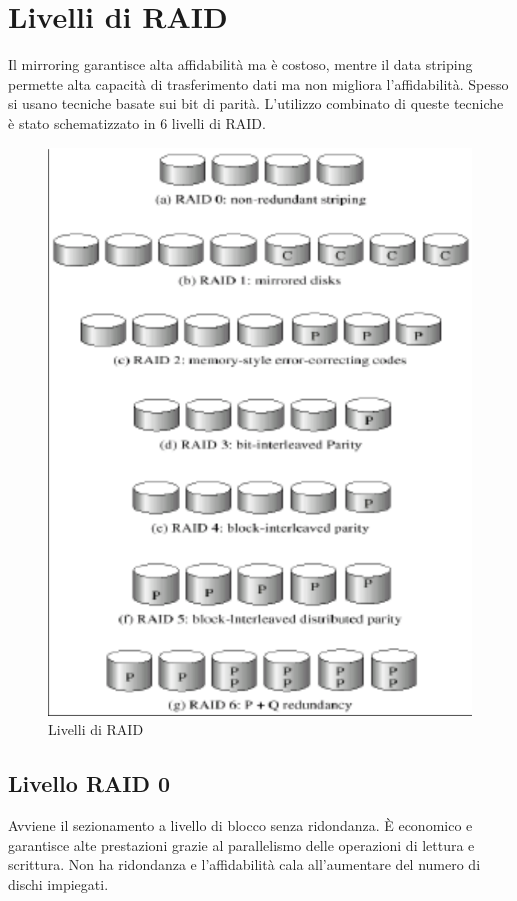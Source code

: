 \section{Livelli di RAID}
Il mirroring garantisce alta affidabilit\`a ma \`e costoso, mentre il data striping permette alta capacit\`a di trasferimento dati ma non migliora l'affidabilit\`a. Spesso si usano
tecniche basate sui bit di parit\`a. L'utilizzo combinato di queste tecniche \`e stato schematizzato in $6$ livelli di RAID. 
\begin{figure}[h]
	\includegraphics[width=\textwidth]{Pictures/RAID.png}
	\caption{Livelli di RAID}
\end{figure}
\subsection{Livello RAID 0}
Avviene il sezionamento a livello di blocco senza ridondanza. \`E economico e garantisce alte prestazioni grazie al parallelismo delle operazioni di lettura e scrittura. Non ha 
ridondanza e l'affidabilit\`a cala all'aumentare del numero di dischi impiegati. 
